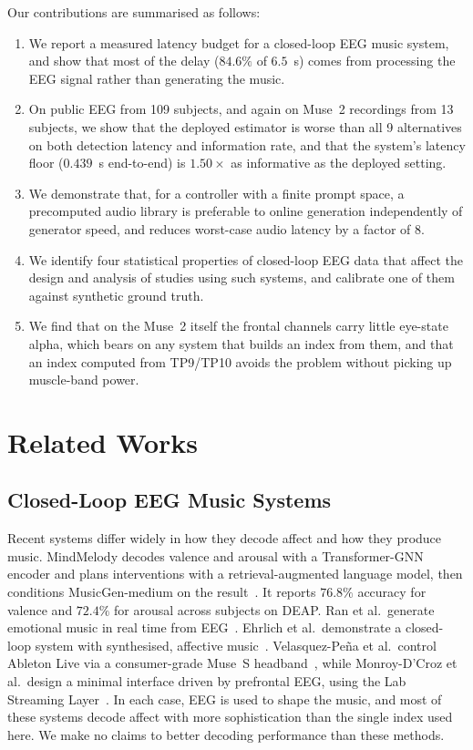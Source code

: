 \documentclass[11pt,a4paper]{article}
\begin{document}
Our contributions are summarised as follows:
\begin{enumerate}
  \item We report a measured latency budget for a closed-loop EEG music
        system, and show that most of the delay ($84.6\%$ of $6.5$~s) comes from
        processing the EEG signal rather than generating the music.
  \item On public EEG from 109 subjects, and again on Muse~2 recordings from 13
        subjects, we show that the deployed estimator is worse
        than all 9 alternatives on both detection latency and information rate, and that
        the system's latency floor ($0.439$~s end-to-end) is $1.50\times$ as informative as
        the deployed setting.
  \item We demonstrate that, for a controller with a finite prompt space, a precomputed
        audio library is preferable to online generation independently of generator
        speed, and reduces worst-case audio latency by a factor of 8.
  \item We identify four statistical properties of closed-loop EEG data that affect the
        design and analysis of studies using such systems, and calibrate one of them
        against synthetic ground truth.
  \item We find that on the Muse~2 itself the frontal channels carry little eye-state
        alpha, which bears on any system that builds an index from them, and that an
        index computed from TP9/TP10 avoids the problem without picking up muscle-band
        power.
\end{enumerate}

\section{Related Works}
\label{sec:related}

\subsection{Closed-Loop EEG Music Systems}

Recent systems differ widely in how they decode affect and how they produce music.
MindMelody decodes valence and arousal with a Transformer-GNN encoder and plans
interventions with a retrieval-augmented language model, then conditions MusicGen-medium on
the result~\cite{mindmelody}. It reports $76.8\%$ accuracy for valence and $72.4\%$ for
arousal across subjects on DEAP. Ran et al.\ generate emotional music in real time from
EEG~\cite{mindtomusic}. Ehrlich et al.\ demonstrate a closed-loop system with synthesised,
affective music~\cite{ehrlich}. Velasquez-Pe\~na et al.\ control Ableton Live via a
consumer-grade Muse~S headband~\cite{neurophone}, while Monroy-D'Croz et al.\ design a
minimal interface driven by prefrontal EEG, using the Lab Streaming
Layer~\cite{minimalist}. In each case, EEG is used to shape the music, and most of these
systems decode affect with more sophistication than the single index used here. We make no
claims to better decoding performance than these methods.
\end{document}
